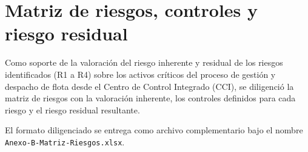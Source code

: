 \section{Matriz de riesgos, controles y riesgo residual}
\label{anexo:matriz-riesgos}

Como soporte de la valoración del riesgo inherente y residual de los riesgos
identificados (R1 a R4) sobre los activos críticos del proceso de gestión y
despacho de flota desde el Centro de Control Integrado (CCI), se diligenció la
matriz de riesgos con la valoración inherente, los controles definidos para
cada riesgo y el riesgo residual resultante.

El formato diligenciado se entrega como archivo complementario bajo el nombre
\texttt{Anexo-B-Matriz-Riesgos.xlsx}.
